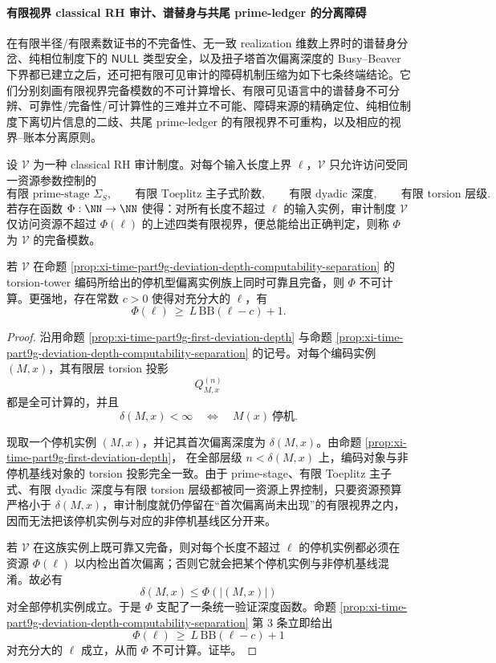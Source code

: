 \paragraph{有限视界 classical RH 审计、谱替身与共尾 prime-ledger 的分离障碍}
在有限半径/有限素数证书的不完备性、无一致 realization 维数上界时的谱替身分岔、纯相位制度下的 \(\mathsf{NULL}\) 类型安全，以及扭子塔首次偏离深度的 Busy--Beaver 下界都已建立之后，还可把有限可见审计的障碍机制压缩为如下七条终端结论。它们分别刻画有限视界完备模数的不可计算增长、有限可见语言中的谱替身不可分辨、可靠性/完备性/可计算性的三难并立不可能、障碍来源的精确定位、纯相位制度下离切片信息的二歧、共尾 prime-ledger 的有限视界不可重构，以及相应的视界--账本分离原则。

\begin{theorem}\label{thm:xi-time-part60eb-finite-horizon-complete-modulus-busybeaver}
设 \(\mathcal V\) 为一种 classical RH 审计制度。对每个输入长度上界 \(\ell\)，\(\mathcal V\) 只允许访问受同一资源参数控制的
\[
\text{有限 prime-stage } \Sigma_S,\qquad
\text{有限 Toeplitz 主子式阶数},\qquad
\text{有限 dyadic 深度},\qquad
\text{有限 torsion 层级}.
\]
若存在函数 \(\Phi:\NN\to\NN\) 使得：对所有长度不超过 \(\ell\) 的输入实例，审计制度 \(\mathcal V\) 仅访问资源不超过 \(\Phi(\ell)\) 的上述四类有限视界，便总能给出正确判定，则称 \(\Phi\) 为 \(\mathcal V\) 的完备模数。

若 \(\mathcal V\) 在命题 \ref{prop:xi-time-part9g-deviation-depth-computability-separation} 的 torsion-tower 编码所给出的停机型偏离实例族上同时可靠且完备，则 \(\Phi\) 不可计算。更强地，存在常数 \(c>0\) 使得对充分大的 \(\ell\)，有
\[
\Phi(\ell)\ \ge\ L\,\mathrm{BB}(\ell-c)+1.
\]
\end{theorem}
\begin{proof}
沿用命题 \ref{prop:xi-time-part9g-first-deviation-depth} 与命题
\ref{prop:xi-time-part9g-deviation-depth-computability-separation}
的记号。对每个编码实例 \((M,x)\)，其有限层 torsion 投影
\[
Q_{M,x}^{(n)}
\]
都是全可计算的，并且
\[
\delta(M,x)<\infty
\quad\Longleftrightarrow\quad
M(x)\ \text{停机}.
\]

现取一个停机实例 \((M,x)\)，并记其首次偏离深度为 \(\delta(M,x)\)。由命题
\ref{prop:xi-time-part9g-first-deviation-depth}，
在全部层级 \(n<\delta(M,x)\) 上，编码对象与非停机基线对象的 torsion 投影完全一致。由于 prime-stage、有限 Toeplitz 主子式、有限 dyadic 深度与有限 torsion 层级都被同一资源上界控制，只要资源预算严格小于 \(\delta(M,x)\)，审计制度就仍停留在“首次偏离尚未出现”的有限视界之内，因而无法把该停机实例与对应的非停机基线区分开来。

若 \(\mathcal V\) 在这族实例上既可靠又完备，则对每个长度不超过 \(\ell\) 的停机实例都必须在资源 \(\Phi(\ell)\) 以内检出首次偏离；否则它就会把某个停机实例与非停机基线混淆。故必有
\[
\delta(M,x)\le \Phi(|(M,x)|)
\]
对全部停机实例成立。于是 \(\Phi\) 支配了一条统一验证深度函数。命题
\ref{prop:xi-time-part9g-deviation-depth-computability-separation}
第 \(3\) 条立即给出
\[
\Phi(\ell)\ \ge\ L\,\mathrm{BB}(\ell-c)+1
\]
对充分大的 \(\ell\) 成立，从而 \(\Phi\) 不可计算。证毕。
\end{proof}


